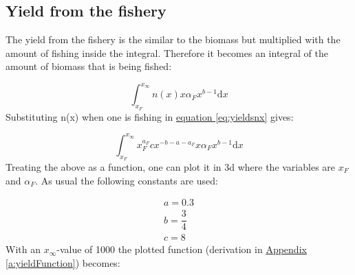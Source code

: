 \documentclass{article}
\numberwithin{equation}{section} %
\newcommand{\md}{\mathrm{d}}
\begin{document}
\subsection{Yield from the fishery}\label{sec:Ex3A}
The yield from the fishery is the similar to the biomass but multiplied with the amount of fishing inside the integral. Therefore it becomes an integral of the amount of biomass that is being fished:

\begin{equation}\label{eq:yieldsnx}
    \int_{x_F}^{x_\infty}n(x)x\alpha_Fx^{b-1}\md x
\end{equation}
Substituting n(x) when one is fishing in \hyperref[eq:yieldsnx]{equation \ref{eq:yieldsnx}} gives:

\begin{equation}\label{eq:ex3yield}
    \int_{x_F}^{x_\infty}x_F^{a_F}cx^{-b-a-a_F}x\alpha_Fx^{b-1}\md x
\end{equation}
Treating the above as a function, one can plot it in 3d where the variables are $x_F$ and $\alpha_F$. As usual the following constants are used:

\begin{align}
    a = 0.3\\
    b = \dfrac{3}{4}\\
    c = 8
\end{align}
With an $x_{\infty}$-value of 1000 the plotted function (derivation in \hyperref[a:yieldFunction]{Appendix \ref{a:yieldFunction}})\label{jmp:a:yieldFunction} becomes:
\end{document}
